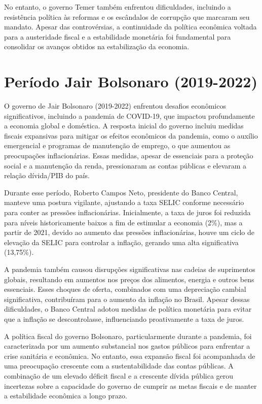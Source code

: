 \documentclass[12pt,oneside,a4paper,chapter=TITLE,english,brazil,sumario=abnt-6027-2012]{abntex2}
\begin{document}
No entanto, o governo Temer também enfrentou dificuldades, incluindo a resistência política às reformas e os escândalos de corrupção que marcaram seu mandato. Apesar das controvérsias, a continuidade da política econômica voltada para a austeridade fiscal e a estabilidade monetária foi fundamental para consolidar os avanços obtidos na estabilização da economia.

\section{Período Jair Bolsonaro (2019-2022)}

O governo de Jair Bolsonaro (2019-2022) enfrentou desafios econômicos significativos, incluindo a pandemia de COVID-19, que impactou profundamente a economia global e doméstica. A resposta inicial do governo incluiu medidas fiscais expansivas para mitigar os efeitos econômicos da pandemia, como o auxílio emergencial e programas de manutenção de emprego, o que aumentou as preocupações inflacionárias. Essas medidas, apesar de essenciais para a proteção social e a manutenção da renda, pressionaram as contas públicas e elevaram a relação dívida/PIB do país.

Durante esse período, Roberto Campos Neto, presidente do Banco Central, manteve uma postura vigilante, ajustando a taxa SELIC conforme necessário para conter as pressões inflacionárias. Inicialmente, a taxa de juros foi reduzida para níveis historicamente baixos a fim de estimular a economia (2\%), mas a partir de 2021, devido ao aumento das pressões inflacionárias, houve um ciclo de elevação da SELIC para controlar a inflação, gerando uma alta significativa (13,75\%).

A pandemia também causou disrupções significativas nas cadeias de suprimentos globais, resultando em aumentos nos preços dos alimentos, energia e outros bens essenciais. Esses choques de oferta, combinados com uma depreciação cambial significativa, contribuíram para o aumento da inflação no Brasil. Apesar dessas dificuldades, o Banco Central adotou medidas de política monetária para evitar que a inflação se descontrolasse, influenciando proativamente a taxa de juros.

A política fiscal do governo Bolsonaro, particularmente durante a pandemia, foi caracterizada por um aumento substancial nos gastos públicos para enfrentar a crise sanitária e econômica. No entanto, essa expansão fiscal foi acompanhada de uma preocupação crescente com a sustentabilidade das contas públicas. A combinação de um elevado déficit fiscal e a crescente dívida pública gerou incertezas sobre a capacidade do governo de cumprir as metas fiscais e de manter a estabilidade econômica a longo prazo.
\end{document}
